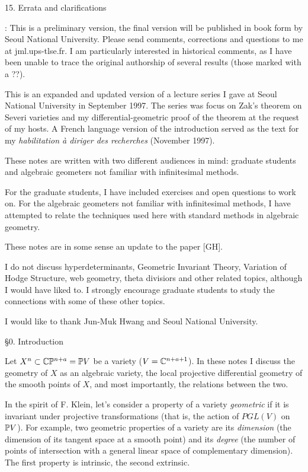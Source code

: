  

15. Errata and clarifications 


: This is a preliminary version, the final
version
will be published in book form by Seoul National University. Please send
comments, corrections and questions to me at jml\@picard.ups-tlse.fr. I am
particularly interested in historical comments, as I have been unable to
trace
the original authorship of several results (those marked with a ??).

\smallpagebreak

This is an expanded and updated version of a lecture
series I gave at
Seoul National University  in September 1997. The series was
focus on Zak's theorem on Severi varieties and my differential-geometric
proof of the theorem at the request of my hosts. A French language version
of the introduction served as the text for my {\it habilitation
\`a diriger des recherches} (November 1997).

These notes are written with two different audiences in
mind: graduate students and  algebraic geometers
not familiar with infinitesimal methods.

For the graduate students, I have included    
exercises  and   open questions to work on. For the   algebraic
geometers not familiar with infinitesimal
methods, I have attempted to relate the
techniques used here with  standard methods in algebraic geometry.

These notes are in some
sense an  update to the   paper [GH].

   I do not discuss    
hyperdeterminants,
  Geometric Invariant
Theory, Variation of Hodge Structure,
  web geometry,  theta divisiors and other related topics,
although I would have liked to.   I strongly encourage graduate
students to study the connections with some of these other topics.
 
 
I would like to thank Jun-Muk Hwang and Seoul
National University.  

 
 
\heading \S 0. Introduction\endheading


Let $X^n\subset\Bbb C\Bbb P^{n+a}=\Bbb P V$ be a variety ($V=\Bbb C^{n+a+1}$). In
these
notes
I   discuss the geometry of $X$ as an algebraic variety,   the local
projective
differential geometry of the smooth points of $X$, and most importantly,
the
relations between the two.
 

In the spirit of F. Klein, let's consider a property of a variety {\it
geometric} if it is invariant under projective transformations
 (that is, the action of $PGL(V)$ on $\Bbb P V$). For example,
two geometric properties
of a variety are its {\it dimension} (the dimension of its tangent
space at a smooth point) and its {\it degree} (the number of points of
intersection with a general linear space of complementary dimension).
The first property is intrinsic, the second extrinsic.


